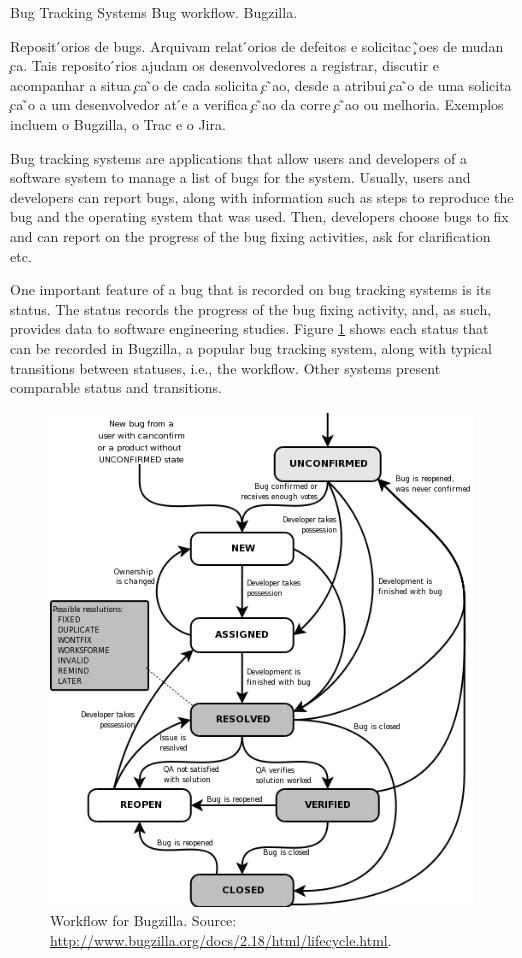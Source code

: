   \begin{subsection}{Bug Tracking Systems}
Bug workflow. Bugzilla. \cite{Bird2009}

Reposit ́orios de bugs. Arquivam relat ́orios de defeitos e solicitac ̧ ̃oes de mudan ̧ca. Tais reposito ́rios ajudam os desenvolvedores a registrar, discutir e acompanhar a situa ̧ca ̃o de cada solicita ̧c ̃ao, desde a atribui ̧ca ̃o de uma solicita ̧ca ̃o a um desenvolvedor at ́e a verifica ̧c ̃ao da corre ̧c ̃ao ou melhoria. Exemplos incluem o Bugzilla, o Trac e o Jira.

Bug tracking systems are applications that allow users and developers of a software system to manage a list of bugs for the system. Usually, users and developers can report bugs, along with information such as steps to reproduce the bug and the operating system that was used. Then, developers choose bugs to fix and can report on the progress of the bug fixing activities, ask for clarification etc.

One important feature of a bug that is recorded on bug tracking systems is its status. The status records the progress of the bug fixing activity, and, as such, provides data to software engineering studies. Figure \ref{fig:bugzilla} shows each status that can be recorded in Bugzilla, a popular bug tracking system, along with typical transitions between statuses, i.e., the workflow. Other systems present comparable status and transitions.

\begin{figure}[ht]
	\centering
		\includegraphics[scale=0.4]{bugzilla.png}
	\caption{Workflow for Bugzilla. Source: \url{http://www.bugzilla.org/docs/2.18/html/lifecycle.html}.}
	\label{fig:bugzilla}
\end{figure}


\end{subsection}
